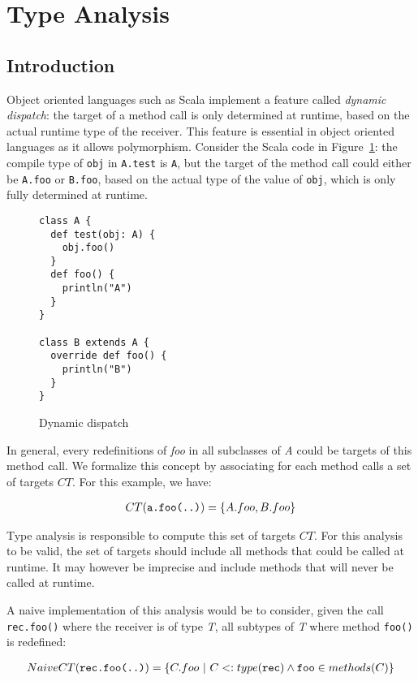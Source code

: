 \section{Type Analysis}

\subsection{Introduction}
Object oriented languages such as Scala implement a feature called
\emph{dynamic dispatch}: the target of a method call is only determined at
runtime, based on the actual runtime type of the receiver. This feature is
essential in object oriented languages as it allows polymorphism. Consider the
Scala code in Figure~\ref{fig:ta:example1}: the compile type of \verb/obj/ in
\verb/A.test/ is \verb/A/, but the target of the method call could either be
\verb/A.foo/ or \verb/B.foo/, based on the actual type of the value of
\verb/obj/, which is only fully determined at runtime.

\begin{figure}[h]
    \centering
\begin{lstlisting}
class A {
  def test(obj: A) {
    obj.foo()
  }
  def foo() {
    println("A")
  }
}

class B extends A {
  override def foo() {
    println("B")
  }
}
\end{lstlisting}
    \caption{Dynamic dispatch}
    \label{fig:ta:example1}
\end{figure}

In general, every redefinitions of \emph{foo} in all subclasses of \emph{A}
could be targets of this method call. We formalize this concept by associating
for each method calls a set of targets $CT$. For this example, we have:

\begin{eqnarray}
    CT(\verb/a.foo(..)/) = \{A.foo, B.foo\}
\end{eqnarray}

Type analysis is responsible to compute this set of targets $CT$. For this
analysis to be valid, the set of targets should include all methods that could
be called at runtime. It may however be imprecise and include methods that will
never be called at runtime.

A naive implementation of this analysis would be to consider, given the call
\verb/rec.foo()/ where the receiver is of type \emph{T}, all subtypes of
\emph{T} where method \verb/foo()/ is redefined:

\begin{eqnarray}
    NaiveCT(\verb/rec.foo(..)/) = \{C.foo ~ | ~ C <: type(\verb/rec/) \land \verb/foo/ \in methods(C) \}
\end{eqnarray}

